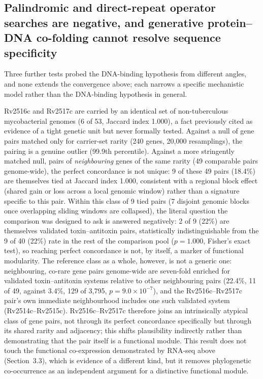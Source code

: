 \documentclass[11pt,a4paper]{article}
\begin{document}
\subsection{Palindromic and direct-repeat operator searches are negative, and generative
protein--DNA co-folding cannot resolve sequence specificity}

Three further tests probed the DNA-binding hypothesis from different angles, and none extends the
convergence above; each narrows a specific mechanistic model rather than the DNA-binding hypothesis
in general.

Rv2516c and Rv2517c are carried by an identical set of non-tuberculous mycobacterial genomes (6 of
53, Jaccard index 1.000), a fact previously cited as evidence of a tight genetic unit but never
formally tested. Against a null of gene pairs matched only for carrier-set rarity (240 genes, 20{,}000
resamplings), the pairing is a genuine outlier (99.9th percentile). Against a more stringently
matched null, pairs of \emph{neighbouring} genes of the same rarity (49 comparable pairs
genome-wide), the perfect concordance is not unique: 9 of these 49 pairs (18.4\%) are themselves
tied at Jaccard index 1.000, consistent with a regional block effect (shared gain or loss across a
local genomic window) rather than a signature specific to this pair. Within this class of 9
tied pairs (7 disjoint genomic blocks once overlapping sliding windows are collapsed), the literal
question the comparison was designed to ask is answered negatively: 2 of 9 (22\%) are themselves
validated toxin--antitoxin pairs, statistically indistinguishable from the 9 of 40 (22\%) rate in
the rest of the comparison pool ($p=1.000$, Fisher's exact test), so reaching perfect concordance is
not, by itself, a marker of functional modularity. The reference class as a whole, however, is not a
generic one: neighbouring, co-rare gene pairs genome-wide are seven-fold enriched for validated
toxin--antitoxin systems relative to other neighbouring pairs (22.4\%, 11 of 49, against 3.4\%, 129
of 3{,}795, $p=9.0\times10^{-7}$), and the Rv2516c--Rv2517c pair's own immediate neighbourhood
includes one such validated system (Rv2514c--Rv2515c). Rv2516c--Rv2517c therefore joins an
intrinsically atypical class of gene pairs, not through its perfect concordance specifically but
through its shared rarity and adjacency; this shifts plausibility indirectly rather than
demonstrating that the pair itself is a functional module. This result does not touch the
functional co-expression demonstrated by RNA-seq above (Section~3.3), which is evidence of a
different kind, but it removes phylogenetic co-occurrence as an independent argument for a
distinctive functional module.
\end{document}
